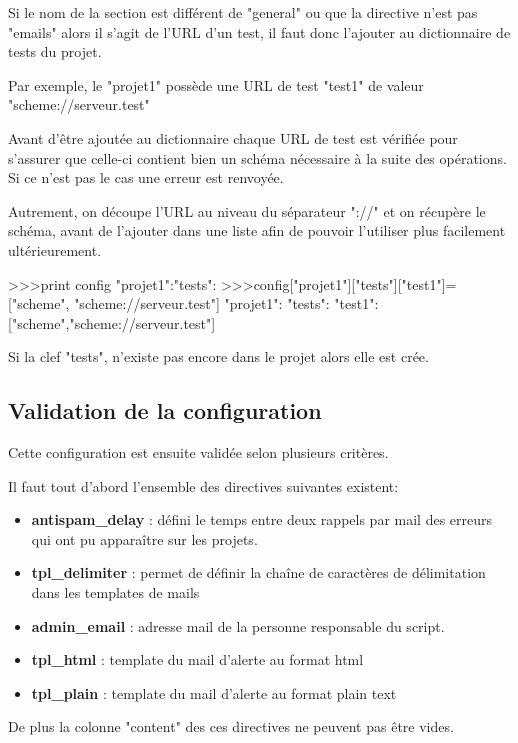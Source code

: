 Si le nom de la section est différent de "general" ou que la directive n'est pas "emails" alors il s'agit de l'URL d'un test, il faut donc l'ajouter au dictionnaire de tests du projet.

Par exemple, le "projet1" possède une URL de test "test1" de valeur "scheme://serveur.test"

Avant d'être ajoutée au dictionnaire chaque URL de test est vérifiée pour s'assurer que celle-ci contient bien un schéma nécessaire à la suite des opérations. Si ce n'est pas le cas une erreur est renvoyée.

Autrement, on découpe l'URL au niveau du séparateur "://" et on récupère le schéma, avant de l'ajouter dans une liste afin de pouvoir l'utiliser plus facilement ultérieurement.

\begin{python}
>>>print config
{"projet1":{"tests":{}}}
>>>config["projet1"]["tests"]["test1"]=["scheme", "scheme://serveur.test"]
{
	"projet1":
	{
		"tests":
		{
			"test1":["scheme","scheme://serveur.test"]
		}
	}
}
\end{python}

Si la clef "tests", n'existe pas encore dans le projet alors elle est crée.


\subsection*{Validation de la configuration}

Cette configuration est ensuite validée selon plusieurs critères.

Il faut tout d'abord l'ensemble des directives suivantes existent:

\begin{itemize}
	\item \textbf{antispam\_delay} : défini le temps entre deux rappels par mail des erreurs qui ont pu apparaître sur les projets. 
	\item \textbf{tpl\_delimiter} : permet de définir la chaîne de caractères de délimitation dans les templates de mails 
	\item \textbf{admin\_email} : adresse mail de la personne responsable du script.
	\item \textbf{tpl\_html} : template du mail d'alerte au format html
	\item \textbf{tpl\_plain} : template du mail d'alerte au format plain text
\end{itemize}

De plus la colonne "content" des ces directives ne peuvent pas être vides.

